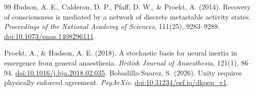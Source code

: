 \begin{thebibliography}{99}
 Hudson, A. E., Calderon, D. P., Pfaff, D. W., \& Proekt, A. (2014). Recovery of consciousness is mediated by a network of discrete metastable activity states. \textit{Proceedings of the National Academy of Sciences}, 111(25), 9283--9288. \href{https://doi.org/10.1073/pnas.1408296111}{doi:10.1073/pnas.1408296111}.

 Proekt, A., \& Hudson, A. E. (2018). A stochastic basis for neural inertia in emergence from general anaesthesia. \textit{British Journal of Anaesthesia}, 121(1), 86--94. \href{https://doi.org/10.1016/j.bja.2018.02.035}{doi:10.1016/j.bja.2018.02.035}.
 Bobadilla-Suarez, S. (2026). Unity requires physically enforced agreement. \textit{PsyArXiv}. \href{https://doi.org/10.31234/osf.io/dkqep_v1}{doi:10.31234/osf.io/dkqep\_v1}.

\end{thebibliography}
